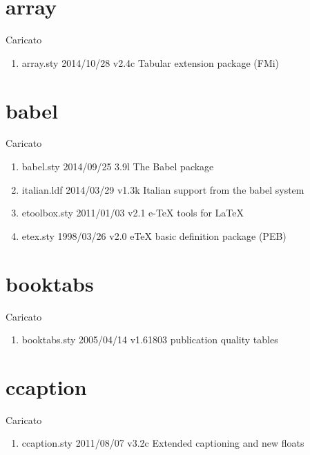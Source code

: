 \section{array}

Caricato 
\begin{enumerate}
\item array.sty 2014/10/28 v2.4c Tabular extension package (FMi)
\end{enumerate}
\section{babel}

Caricato 
\begin{enumerate}
\item babel.sty 2014/09/25 3.9l The Babel package
\item italian.ldf 2014/03/29 v1.3k Italian support from the babel system
\item etoolbox.sty 2011/01/03 v2.1 e-TeX tools for LaTeX
\item etex.sty 1998/03/26 v2.0 eTeX basic definition package (PEB)
\end{enumerate}
\lstset{language=TeX}
\section{booktabs}

Caricato 
\begin{enumerate}
\item booktabs.sty 2005/04/14 v1.61803 publication quality tables
\end{enumerate}
\section{ccaption}

Caricato
\begin{enumerate}
\item ccaption.sty 2011/08/07 v3.2c Extended captioning and new floats
\end{enumerate}

